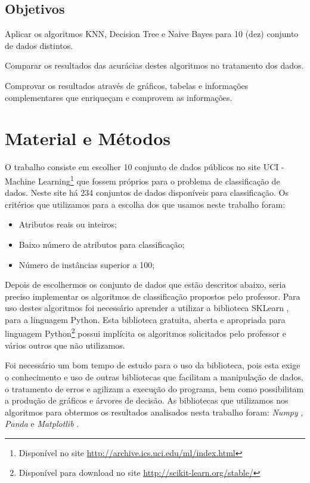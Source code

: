 \documentclass[12pt, a4paper]{article}
\begin{document}
\subsection{Objetivos}
Aplicar os algoritmos KNN, Decision Tree e Naive Bayes para 10 (dez) conjunto de dados distintos.

Comparar os resultados das acurácias destes algoritmos no tratamento dos dados.

Comprovar os resultados através de gráficos, tabelas e informações complementares que enriqueçam e comprovem as informações.


\section{Material e Métodos}
O trabalho consiste em escolher 10 conjunto de dados públicos no site UCI - Machine Learning\footnote{Disponível no site \url{http://archive.ics.uci.edu/ml/index.html}} que fossem próprios para o problema de classificação de dados. Neste site há 234 conjuntos de dados disponíveis para classificação. Os critérios que utilizamos para a escolha dos que usamos neste trabalho foram:
	\begin{itemize}
    \item Atributos reais ou inteiros;
    \item Baixo número de atributos para classificação;
    \item Número de instâncias superior a 100;
    \end{itemize}
    
Depois de escolhermos os conjunto de dados que estão descritos abaixo, seria preciso implementar os algoritmos de classificação propostos pelo professor. Para uso destes algoritmos foi necessário aprender a utilizar a biblioteca SKLearn \cite{scikit-learn}, para a linguagem Python. Esta biblioteca gratuita, aberta e apropriada para linguagem Python\footnote{Disponível para download no site \url{http://scikit-learn.org/stable/}} possui implícita os algoritmos solicitados pelo professor e vários outros que não utilizamos.

Foi necessário um bom tempo de estudo para o uso da biblioteca, pois esta exige o conhecimento e uso de outras bibliotecas que facilitam a manipulação de dados, o tratamento de erros e agilizam a execução do programa, bem como possibilitam a produção de gráficos e árvores de decisão. As bibliotecas que utilizamos nos algoritmos para obtermos os resultados analisados nesta trabalho foram: \emph{Numpy} \citep{van_etal2011}, \emph{Panda} \citep{mckinney-proc-scipy-2010} e \emph{Matplotlib} \citep{hunter2007}.
\end{document}
